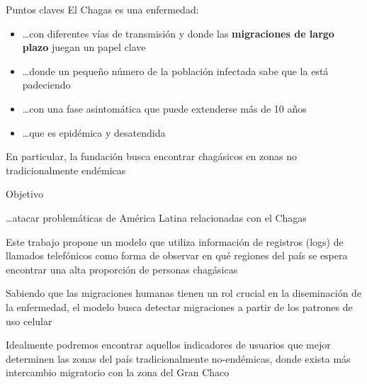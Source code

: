 \documentclass{beamer}
\begin{document}
\begin{frame}{Puntos claves}
	El Chagas es una enfermedad:
	\begin{itemize}
		\item \ldots con diferentes vías de transmisión y donde las \textbf{migraciones de largo plazo} juegan un papel clave
		\item \ldots donde un pequeño número de la población infectada sabe que la está padeciendo
		\item \ldots con una fase asintomática que puede extenderse más de 10 años
		\item \ldots que es epidémica y desatendida
	\end{itemize}
	En particular, la fundación busca encontrar chagásicos en zonas no tradicionalmente endémicas
\end{frame}


\begin{frame}{Objetivo}
	\begin{block}{\ldots atacar problemáticas de América Latina relacionadas con el Chagas}

	Este trabajo propone un modelo que utiliza información de registros (logs) de llamados telefónicos
	como forma de observar en qué regiones del país se espera encontrar una alta proporción de personas chagásicas

	\bigskip
	Sabiendo que las migraciones humanas tienen un rol crucial en la diseminación de la enfermedad, el modelo busca
	detectar migraciones a partir de los patrones de uso celular

	\bigskip
	Idealmente podremos encontrar aquellos indicadores de usuarios que mejor determinen las zonas del país tradicionalmente no-endémicas, donde exista más intercambio migratorio con la zona del Gran Chaco
	\end{block}
\end{frame}
\end{document}
